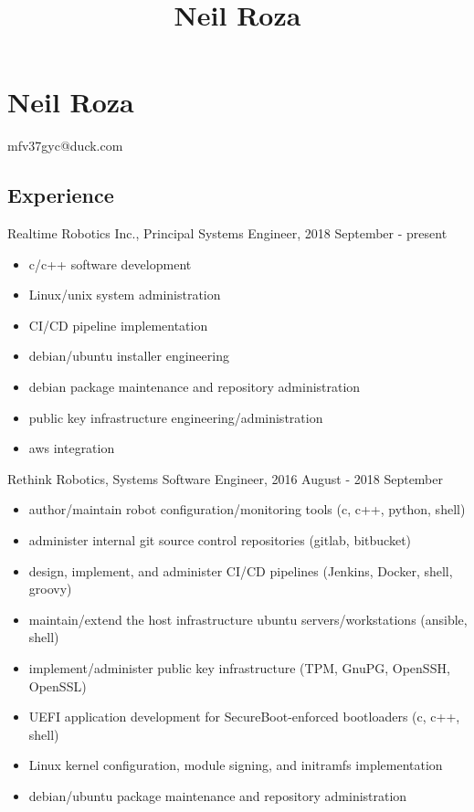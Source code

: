 \documentclass[letterpaper,10pt]{article}
\title{Neil Roza}
\begin{document}
\pagestyle{empty}

\section*{Neil Roza}

mfv37gyc@duck.com

\subsection*{Experience}

Realtime Robotics Inc., Principal Systems Engineer, 2018 September - present

\begin{itemize}
\itemsep0em
\item c/c++ software development
\item Linux/unix system administration
\item CI/CD pipeline implementation
\item debian/ubuntu installer engineering
\item debian package maintenance and repository administration
\item public key infrastructure engineering/administration
\item aws integration
\end{itemize}

Rethink Robotics, Systems Software Engineer, 2016 August - 2018 September

\begin{itemize}
  \itemsep0em
\item author/maintain robot configuration/monitoring tools (c, c++, python,
  shell)
\item administer internal git source control repositories (gitlab, bitbucket)
\item design, implement, and administer CI/CD pipelines (Jenkins, Docker,
  shell, groovy)
\item maintain/extend the host infrastructure ubuntu servers/workstations (ansible,
  shell)
\item implement/administer public key infrastructure (TPM, GnuPG, OpenSSH,
  OpenSSL)
\item UEFI application development for SecureBoot-enforced bootloaders (c, c++,
  shell)
\item Linux kernel configuration, module signing, and initramfs implementation
\item debian/ubuntu package maintenance and repository administration
\end{itemize}
\end{document}
